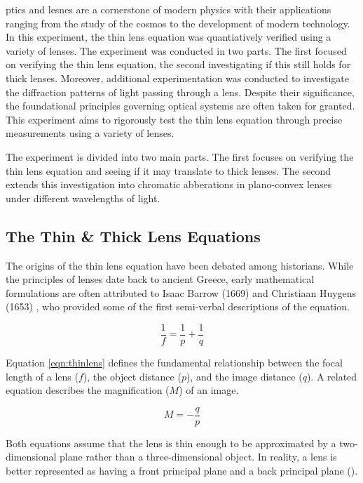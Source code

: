 \documentclass[aip, cp, amsmath, amssymb, reprint, nofootinbib]{revtex4-2}
\begin{document}
        ptics and lesnes are a cornerstone of modern physics with their applications ranging from the study of the cosmos to the development of modern technology. In this experiment, the thin lens equation was quantiatively verified using a variety of lenses. The experiment was conducted in two parts. The first focused on verifying the thin lens equation, the second investigating if this still holds for thick lenses. Moreover, additional experimentation was conducted to investigate the diffraction patterns of light passing through a lens. Despite their significance, the foundational principles governing optical systems are often taken for granted. This experiment aims to rigorously test the thin lens equation through precise measurements using a variety of lenses.
        
        The experiment is divided into two main parts. The first focuses on verifying the thin lens equation and seeing if it may translate to thick lenses. The second extends this investigation into chromatic abberations in plano-convex lenses under different wavelengths of light.

        \subsection{The Thin \& Thick Lens Equations}
        
        The origins of the thin lens equation have been debated among historians. While the principles of lenses date back to ancient Greece, early mathematical formulations are often attributed to Isaac Barrow (1669) and Christiaan Huygens (1653) \cite{historyoptics}, who provided some of the first semi-verbal descriptions of the equation.
        
        \begin{equation} \label{eqn:thinlens}
            \frac{1}{f} = \frac{1}{p} + \frac{1}{q}
        \end{equation}
        
        Equation \eqref{eqn:thinlens} defines the fundamental relationship between the focal length of a lens ($f$), the object distance ($p$), and the image distance ($q$). A related equation describes the magnification ($M$) of an image.
        
        \begin{equation} \label{eqn:mag}
            M = -\frac{q}{p}
        \end{equation}
        
        Both equations assume that the lens is thin enough to be approximated by a two-dimensional plane rather than a three-dimensional object. In reality, a lens is better represented as having a front principal plane and a back principal plane ().
        
\end{document}
